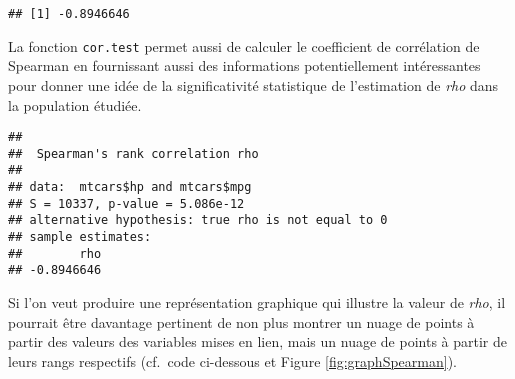 \documentclass[
  french,
]{book}
\newenvironment{Shaded}{\begin{snugshade}}{\end{snugshade}}
\newcommand{\DataTypeTok}[1]{\textcolor[rgb]{0.13,0.29,0.53}{#1}}
\newcommand{\KeywordTok}[1]{\textcolor[rgb]{0.13,0.29,0.53}{\textbf{#1}}}
\newcommand{\NormalTok}[1]{#1}
\newcommand{\OperatorTok}[1]{\textcolor[rgb]{0.81,0.36,0.00}{\textbf{#1}}}
\newcommand{\OtherTok}[1]{\textcolor[rgb]{0.56,0.35,0.01}{#1}}
\newcommand{\StringTok}[1]{\textcolor[rgb]{0.31,0.60,0.02}{#1}}
\begin{document}
\begin{verbatim}
## [1] -0.8946646
\end{verbatim}

La fonction \texttt{cor.test} permet aussi de calculer le coefficient de corrélation de Spearman en fournissant aussi des informations potentiellement intéressantes pour donner une idée de la significativité statistique de l'estimation de \emph{rho} dans la population étudiée.

\begin{Shaded}
\end{Shaded}

\begin{verbatim}
## 
##  Spearman's rank correlation rho
## 
## data:  mtcars$hp and mtcars$mpg
## S = 10337, p-value = 5.086e-12
## alternative hypothesis: true rho is not equal to 0
## sample estimates:
##        rho 
## -0.8946646
\end{verbatim}

Si l'on veut produire une représentation graphique qui illustre la valeur de \emph{rho}, il pourrait être davantage pertinent de non plus montrer un nuage de points à partir des valeurs des variables mises en lien, mais un nuage de points à partir de leurs rangs respectifs (cf.~code ci-dessous et Figure \ref{fig:graphSpearman}).

\begin{Shaded}
\end{Shaded}
\end{document}
